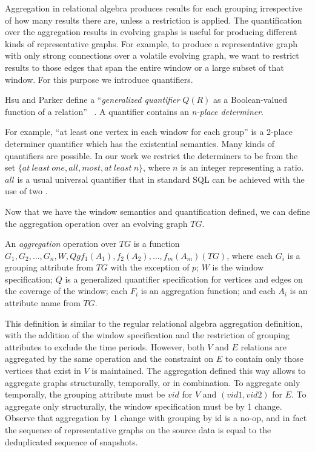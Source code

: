 
Aggregation in relational algebra produces results for each grouping
irrespective of how many results there are, unless a 
restriction is applied.  The quantification over the aggregation
results in evolving graphs is useful for producing different kinds of
representative graphs.  For example, to produce a representative graph
with only strong connections over a volatile evolving graph, we want
to restrict results to those edges that span the entire window or a
large subset of that window.  For this purpose we introduce
quantifiers.

Hsu and Parker define a ``{\em generalized quantifier} $Q(R)$ as a
Boolean-valued function of a relation'' ~\cite{Hsu1995}.  A quantifier
contains an {\em n-place determiner}.

For example, ``at least one vertex in each window for each group'' is
a 2-place determiner quantifier which has the existential semantics.
Many kinds of quantifiers are possible.  In our work we restrict the
determiners to be from the set $\{at\ least\ one, all, most,
at\ least\ n\}$, where $n$ is an integer representing a ratio.  $all$
is a usual universal quantifier that in standard SQL can be achieved
with the use of two .

Now that we have the window semantics and quantification defined, we
can define the aggregation operation over an evolving graph $TG$.

\begin{definition}[\tg Aggregation]
An {\em aggregation} operation over $TG$ is a function \\ $G_1, G_2,
\ldots, G_n, W, Q g f_1(A_1), f_2(A_2), \ldots, f_m(A_m)(TG)$, where
each $G_i$ is a grouping attribute from $TG$ with the exception of
$p$; $W$ is the window specification; $Q$ is a generalized quantifier
specification for vertices and edges on the coverage of the window;
each $F_i$ is an aggregation function; and each $A_i$ is an attribute
name from $TG$.
\label{def:agg}
\end{definition}

This definition is similar to the regular relational algebra
aggregation definition, with the addition of the window specification
and the restriction of grouping attributes to exclude the time
periods.  However, both $V$ and $E$ relations are aggregated by the
same operation and the constraint on $E$ to contain only those
vertices that exist in $V$ is maintained.  The aggregation defined
this way allows to aggregate graphs structurally, temporally, or in
combination.  To aggregate only temporally, the grouping attribute
must be $vid$ for $V$ and $(vid1, vid2)$ for $E$.  To aggregate only
structurally, the window specification must be by 1 change.  Observe
that aggregation by 1 change with grouping by id is a no-op, and in
fact the sequence of representative graphs on the source data is equal
to the deduplicated sequence of snapshots.

